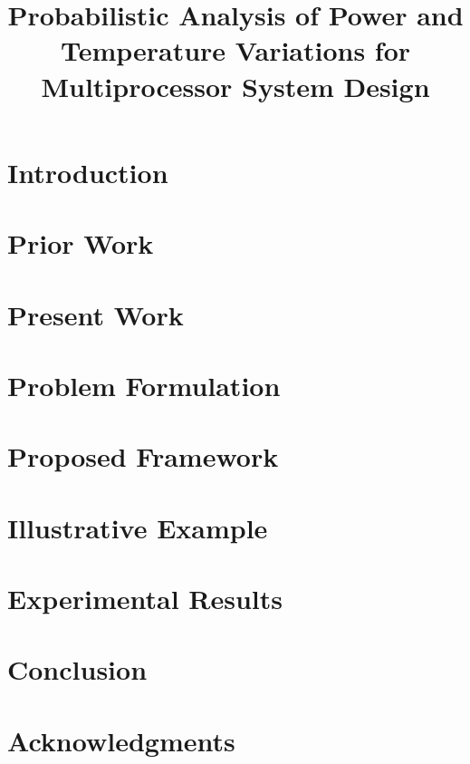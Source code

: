 \documentclass[journal]{IEEEtran}
\begin{document}
  \title{Probabilistic Analysis of Power and Temperature Variations for Multiprocessor System Design}

  \author{
    
  }

  \maketitle

  \begin{abstract}
    
  \end{abstract}

  \section{Introduction} 
  

  \section{Prior Work} 
  

  \section{Present Work} 
  

  \section{Problem Formulation} 
  

  \section{Proposed Framework} 
  

  \section{Illustrative Example} 
  

  \section{Experimental Results} 
  

  \section{Conclusion} 
  

  \section{Acknowledgments}
  

  \printbibliography

  \appendix
  
\end{document}
